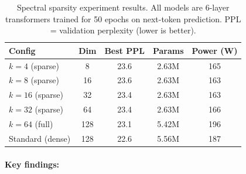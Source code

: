 \documentclass[10pt,twocolumn]{article}
\begin{document}
\begin{table}[t]
\centering
\caption{Spectral sparsity experiment results. All models are 6-layer transformers trained for 50 epochs on next-token prediction. PPL = validation perplexity (lower is better).}
\label{tab:sparsewave_results}
\small
\begin{tabular}{@{}lcccc@{}}
\toprule
\textbf{Config} & \textbf{Dim} & \textbf{Best PPL} & \textbf{Params} & \textbf{Power (W)} \\
\midrule
$k = 4$ (sparse)   & 8   & 23.6 & 2.63M & 165 \\
$k = 8$ (sparse)   & 16  & 23.6 & 2.63M & 163 \\
$k = 16$ (sparse)  & 32  & 23.4 & 2.63M & 163 \\
$k = 32$ (sparse)  & 64  & 23.4 & 2.63M & 166 \\
$k = 64$ (full)    & 128 & 23.1 & 5.42M & 196 \\
\midrule
Standard (dense)   & 128 & 22.6 & 5.56M & 187 \\
\bottomrule
\end{tabular}
\end{table}

\paragraph{Key findings:}
\end{document}

